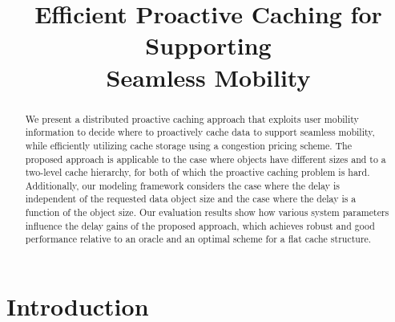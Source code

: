 \documentclass[conference]{IEEEtran}
\newcommand{\mynotex}[1]{}
\begin{document}
\title{Efficient Proactive Caching for Supporting \\ Seamless Mobility
\vspace{-0.4in}
}



\author{
}



\maketitle


\begin{abstract}
We present a distributed proactive caching approach that exploits user mobility information to decide where to proactively cache data to support seamless mobility, while efficiently utilizing cache storage using a congestion pricing scheme. The proposed approach is applicable to the case where objects have different sizes and to a two-level cache hierarchy, for both of which the proactive caching problem is hard. Additionally, our modeling framework considers the case where the delay is independent of the requested data object size and the case where the delay is a function of the object size. Our evaluation results show how various system parameters influence the delay gains of the proposed approach, which achieves robust and good performance relative to an oracle and an optimal scheme for  a flat cache structure.

\mynotex{Possible also include that we prove they are NP?}

\end{abstract}



\vspace{-0.09in}
\section{Introduction}
\vspace{-0.03in}
\end{document}
